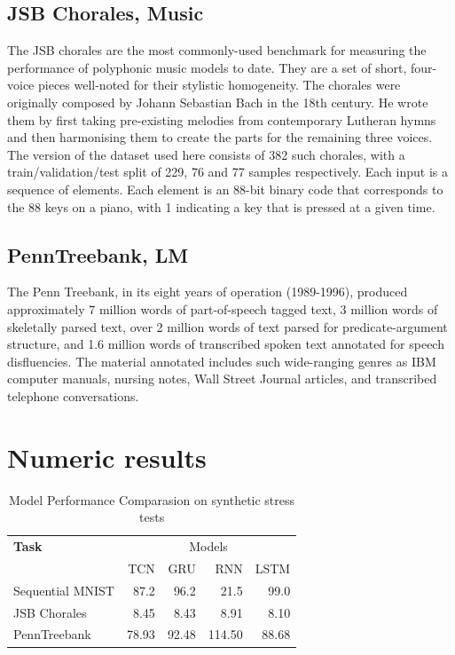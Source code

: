 \subsection{JSB Chorales, Music}
The JSB chorales are the most commonly-used benchmark for measuring the performance of polyphonic music models to date. They are a set of short, four-voice pieces well-noted for their stylistic homogeneity. The chorales were originally composed by Johann Sebastian Bach in the 18th century. He wrote them by first taking pre-existing melodies from contemporary Lutheran hymns and then harmonising them to create the parts for the remaining three voices. The version of the dataset used here consists of 382 such chorales, with a train/validation/test split of 229, 76 and 77 samples respectively. Each input is a sequence of elements. Each element is an 88-bit binary code that corresponds to the 88 keys on a piano, with 1 indicating a key that is pressed at a given time.

\subsection{PennTreebank, LM}
The Penn Treebank, in its eight years of operation (1989-1996), produced approximately 7 million words of part-of-speech tagged text, 3 million words of skeletally parsed text, over 2 million words of text parsed for predicate-argument structure, and 1.6 million words of transcribed spoken text annotated for speech disfluencies. The material annotated includes such wide-ranging genres as IBM computer manuals, nursing notes, Wall Street Journal articles, and transcribed telephone conversations.

\section{Numeric results}
\begin{table}[H]
\centering
\caption{Model Performance Comparasion on synthetic stress tests}
\begin{tabular}{l r r r r}
\toprule
\textbf{Task} & \multicolumn{4}{c}{Models}\\
& TCN&GRU&RNN&LSTM\\
\midrule
Sequential MNIST & 87.2&96.2&21.5&99.0\\
JSB Chorales & 8.45&8.43&8.91&8.10 \\
PennTreebank& 78.93&92.48&114.50&88.68\\
\bottomrule
\end{tabular}
\label{tab:ch3-tcn}
\end{table}

